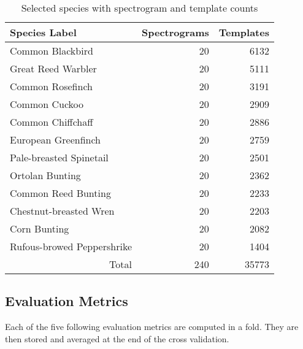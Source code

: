 \begin{table}[!htb]
  \caption{Selected species with spectrogram and template counts}
  \label{tbl:used_data}
  \centering
  \begin{tabular}{l r r}
    Species Label & Spectrograms & Templates \\ \hline
    Common Blackbird           & 20 & 6132\\
    Great Reed Warbler         & 20 & 5111\\
    Common Rosefinch           & 20 & 3191\\
    Common Cuckoo              & 20 & 2909\\
    Common Chiffchaff          & 20 & 2886\\
    European Greenfinch        & 20 & 2759\\
    Pale-breasted Spinetail    & 20 & 2501\\
    Ortolan Bunting            & 20 & 2362\\
    Common Reed Bunting        & 20 & 2233\\
    Chestnut-breasted Wren     & 20 & 2203\\
    Corn Bunting               & 20 & 2082\\
    Rufous-browed Peppershrike & 20 & 1404\\ \hline
    \multicolumn{1}{r}{Total} & 240 & 35773
  \end{tabular}
\end{table}

\subsection{Evaluation Metrics}\label{sec:metrics}
Each of the five following evaluation metrics are computed in a fold.
They are then stored and averaged at the end of the cross validation.

